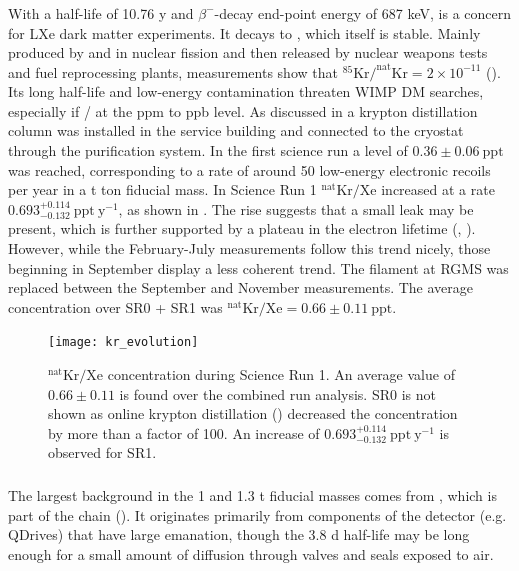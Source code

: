 \subsubsection{}
\label{subsubsec:backgrounds_electronic_krypton}
With a half-life of 10.76 y and $\beta^-$-decay end-point energy of 687 keV,  is a concern for LXe dark matter
experiments.  It decays to , which itself is stable.  Mainly
produced by  and  in nuclear fission and then released by nuclear weapons tests and fuel reprocessing plants,
measurements show that $\mathrm{^{85}Kr / ^{nat}Kr} = 2 \times 10^{-11}$ ().  Its long half-life and low-energy
contamination threaten WIMP DM searches, especially if / at the ppm to ppb level.  As discussed in
 a krypton distillation column was installed in the service building and connected to the cryostat through
the purification system.  In the first science run a level of $0.36 \pm 0.06\ \mathrm{ppt}$ was reached, corresponding to a rate of
around 50 low-energy electronic recoils per year in a t ton fiducial mass.  In Science Run 1 $\mathrm{^{nat}Kr / Xe}$ increased at a rate
$0.693_{-0.132}^{+0.114}\ \mathrm{ppt\ y^{-1}}$, as shown in
.  The rise suggests that a small leak may be present, which is further supported
by a plateau in the electron lifetime (, ).  However, while the February-July
measurements follow this trend nicely, those beginning in September display a less coherent trend.  The filament at RGMS was replaced
between the September and November measurements.  The average concentration over SR0 + SR1 was
$^{\mathrm{nat}}\mathrm{Kr}/\mathrm{Xe} = 0.66 \pm 0.11\ \mathrm{ppt}$.

\begin{figure}
\centering
\texttt{[image: kr\_evolution]}
\caption{$\mathrm{^{nat}Kr / Xe}$ concentration during Science Run 1.  An average value of $0.66 \pm 0.11$ is found over the combined
run analysis.  SR0 is not shown as online krypton distillation () decreased the concentration by more than
a factor of 100.  An increase of $0.693_{-0.132}^{+0.114}\ \mathrm{ppt\ y^{-1}}$ is observed for SR1.}
\label{fig:backgrounds_electronic_krypton_rate_increase}
\end{figure}

\subsubsection{}
\label{subsubsec:backgrounds_electronic_radon}
The largest background in the 1 and 1.3 t fiducial masses comes from , which is part of the  chain
().  It originates primarily from components of the detector (e.g. QDrives) that have large
 emanation, though the 3.8 d half-life may be long enough for a small amount of diffusion through valves and seals
exposed to air.

